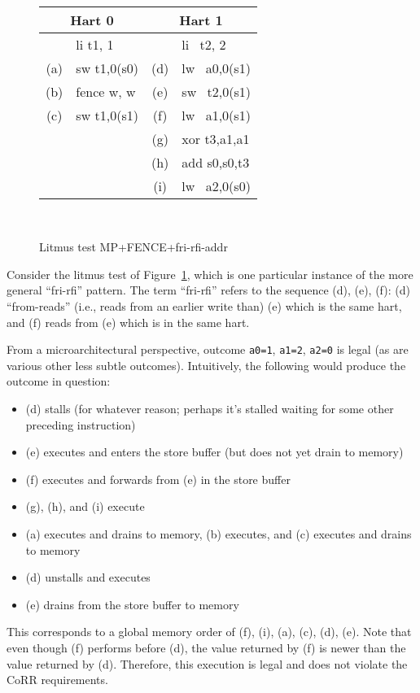 \begin{figure}[h!]
  \center
  {
    \tt\small
    \begin{tabular}{cl||cl}
    \multicolumn{2}{c}{Hart 0} & \multicolumn{2}{c}{Hart 1} \\
    \hline
          & li t1, 1    &     & li~ t2, 2    \\
      (a) & sw t1,0(s0) & (d) & lw~ a0,0(s1) \\
      (b) & fence w, w  & (e) & sw~ t2,0(s1) \\
      (c) & sw t1,0(s1) & (f) & lw~ a1,0(s1) \\
          &             & (g) & xor t3,a1,a1 \\
          &             & (h) & add s0,s0,t3 \\
          &             & (i) & lw~ a2,0(s0) \\
    \end{tabular}
  }
  ~~~~
  \diagram
  \caption{Litmus test MP+FENCE+fri-rfi-addr}
  \label{fig:litmus:frirfi}
\end{figure}

Consider the litmus test of Figure~\ref{fig:litmus:frirfi}, which is one particular instance of the more general ``fri-rfi'' pattern.
The term ``fri-rfi'' refers to the sequence (d), (e), (f): (d) ``from-reads'' (i.e., reads from an earlier write than) (e) which is the same hart, and (f) reads from (e) which is in the same hart.

From a microarchitectural perspective, outcome {\tt a0=1}, {\tt a1=2}, {\tt a2=0} is legal (as are various other less subtle outcomes).  Intuitively, the following would produce the outcome in question:
\begin{itemize}
  \item (d) stalls (for whatever reason; perhaps it's stalled waiting for some other preceding instruction)
  \item (e) executes and enters the store buffer (but does not yet drain to memory)
  \item (f) executes and forwards from (e) in the store buffer
  \item (g), (h), and (i) execute
  \item (a) executes and drains to memory, (b) executes, and (c) executes and drains to memory
  \item (d) unstalls and executes
  \item (e) drains from the store buffer to memory
\end{itemize}
This corresponds to a global memory order of (f), (i), (a), (c), (d), (e).
Note that even though (f) performs before (d), the value returned by (f) is newer than the value returned by (d).
Therefore, this execution is legal and does not violate the CoRR requirements.

